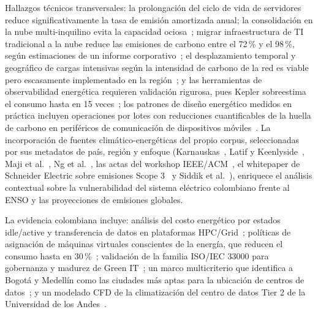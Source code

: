 \documentclass[conference]{IEEEtran}
\begin{document}
Hallazgos t\'ecnicos transversales: la prolongaci\'on del ciclo de vida de servidores reduce significativamente la tasa de emisi\'on amortizada anual; la consolidaci\'on en la nube multi-inquilino evita la capacidad ociosa~\cite{rodriguez2022,petrocelli2021}; migrar infraestructura de TI tradicional a la nube reduce las emisiones de carbono entre el 72\,\% y el 98\,\%, seg\'un estimaciones de un informe corporativo~\cite{microsoft2020}; el desplazamiento temporal y geogr\'afico de cargas intensivas seg\'un la intensidad de carbono de la red es viable pero escasamente implementado en la regi\'on~\cite{bellal2026,lozoya2022}; y las herramientas de observabilidad energ\'etica requieren validaci\'on rigurosa, pues Kepler sobreestima el consumo hasta en 15 veces~\cite{bellal2026}; los patrones de dise\~no energ\'etico medidos en pr\'actica incluyen operaciones por lotes con reducciones cuantificables de la huella de carbono en perif\'ericos de comunicaci\'on de dispositivos m\'oviles~\cite{vergallo2024}. La incorporaci\'on de fuentes clim\'atico-energ\'eticas del propio corpus, seleccionadas por sus metadatos de pa\'is, regi\'on y enfoque (Karnauskas~\cite{karnauskas2025}, Latif y Keenlyside~\cite{latif2009}, Maji et al.~\cite{maji2025}, Ng et al.~\cite{ng2017}, las actas del workshop IEEE/ACM~\cite{ProceedingsIEEEACM2026}, el whitepaper de Schneider Electric sobre emisiones {Scope 3}~\cite{lin2023} y Siddik et al.~\cite{siddik2021}), enriquece el an\'alisis contextual sobre la vulnerabilidad del sistema el\'ectrico colombiano frente al ENSO y las proyecciones de emisiones globales.

La evidencia colombiana incluye: an\'alisis del costo energ\'etico por estados idle/active y transferencia de datos en plataformas HPC/Grid~\cite{hernandez2011}; pol\'iticas de asignaci\'on de m\'aquinas virtuales conscientes de la energ\'ia, que reducen el consumo hasta en 30\,\%~\cite{diaz2013}; validaci\'on de la familia ISO/IEC 33000 para gobernanza y madurez de Green IT~\cite{paton2019}; un marco multicriterio que identifica a Bogot\'a y Medell\'in como las ciudades m\'as aptas para la ubicaci\'on de centros de datos~\cite{torres2026}; y un modelado {CFD} de la climatizaci\'on del centro de datos Tier 2 de la Universidad de los Andes~\cite{pico2022cfd}.
\end{document}
